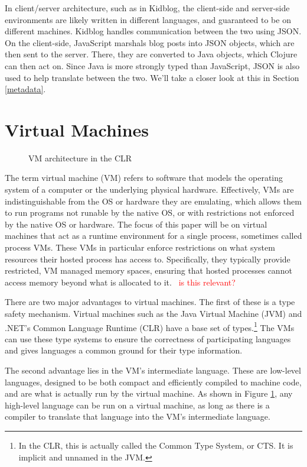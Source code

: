 \documentclass{sig-alternate}
\newcommand{\mycomment}[1]{\textcolor{red}{#1}}
\begin{document}
In client/server architecture, such as in Kidblog, the client-side and server-side environments are likely written in different languages, and guaranteed to be on different machines. Kidblog handles communication between the two using JSON. On the client-side, JavaScript marshals blog posts into JSON objects, which are then sent to the server. There, they are converted to Java objects, which Clojure can then act on. Since Java is more strongly typed than JavaScript, JSON is also used to help translate between the two. We'll take a closer look at this in Section \ref{metadata}.



\section{Virtual Machines}\label{VM}
\begin{figure}
\caption{VM architecture in the CLR~\cite{wiki:CLR}}
\label{VMmodel}
\end{figure}

The term virtual machine (VM) refers to software that models the operating system of a computer or the underlying physical hardware. Effectively, VMs are indistinguishable from the OS or hardware they are emulating, which allows them to run programs not runable by the native OS, or with restrictions not enforced by the native OS or hardware.
The focus of this paper will be on virtual machines that act as a runtime environment for a single process, sometimes called process VMs. These VMs in particular enforce restrictions on what system resources their hosted process has access to. Specifically, they typically provide restricted, VM managed memory spaces, ensuring that hosted processes cannot access memory beyond what is allocated to it.~\cite{wiki:VM} \mycomment{is this relevant?}

There are two major advantages to virtual machines. The first of these is a type safety mechanism. Virtual machines such as the Java Virtual Machine (JVM) and .NET's Common Language Runtime (CLR) have a base set of types.\footnote{In the CLR, this is actually called the Common Type System, or CTS. It is implicit and unnamed in the JVM.} The VMs can use these type systems to ensure the correctness of participating languages and gives languages a common ground for their type information.

The second advantage lies in the VM's intermediate language. These are low-level languages, designed to be both compact and efficiently compiled to machine code, and are what is actually run by the virtual machine. As shown in Figure \ref{VMmodel}, any high-level language can be run on a virtual machine, as long as there is a compiler to translate that language into the VM's intermediate language.
\end{document}
